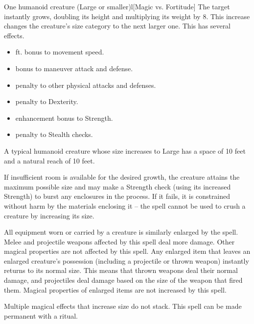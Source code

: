 \begin{spellheader}
    \spellrng{\rngclose}
    \spelldur{\durshort \dismissable}
\end{spellheader}
\begin{spelleffects}
    \begin{spelltarget}{One humanoid creature (Large or smaller)}l[Magic vs. Fortitude]
        \spelleffect The target instantly grows, doubling its height and multiplying its weight by 8. This increase changes the creature's size category to the next larger one. This has several effects.
        \begin{itemize} 
            \item {} ft. bonus to movement speed.
            \item {} bonus to maneuver attack and defense.
            \item {} penalty to other physical attacks and defenses.
            \item {} penalty to Dexterity.
            \item {} enhancement bonus to Strength.
            \item {} penalty to Stealth checks.
        \end{itemize}
        \par A typical humanoid creature whose size increases to Large has a space of 10 feet and a natural reach of 10 feet.
        \par If insufficient room is available for the desired growth, the creature attains the maximum possible size and may make a Strength check (using its increased Strength) to burst any enclosures in the process. If it fails, it is constrained without harm by the materials enclosing it -- the spell cannot be used to crush a creature by increasing its size.
        \par All equipment worn or carried by a creature is similarly enlarged by the spell. Melee and projectile weapons affected by this spell deal more damage. Other magical properties are not affected by this spell. Any enlarged item that leaves an enlarged creature's possession (including a projectile or thrown weapon) instantly returns to its normal size. This means that thrown weapons deal their normal damage, and projectiles deal damage based on the size of the weapon that fired them. Magical properties of enlarged items are not increased by this spell.
    \end{spelltarget}
\end{spelleffects}
\begin{spellfooter}
    \spellnotes Multiple magical effects that increase size do not stack. This spell can be made permanent with a  ritual.
\end{spellfooter}

